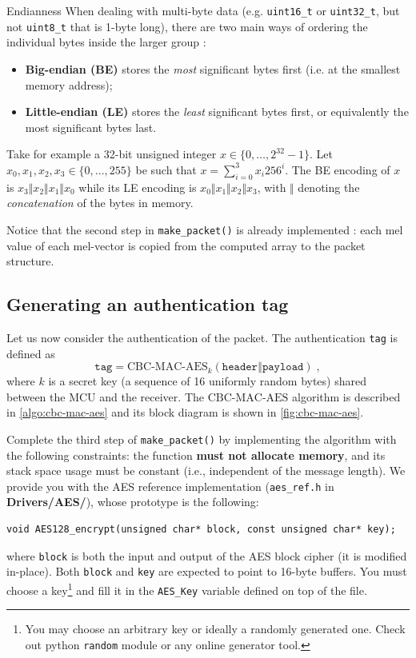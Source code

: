 \begin{bclogo}[couleur = gray!20, arrondi = 0.2, logo=\bcinfo]{Endianness}
	When dealing with multi-byte data (e.g. \texttt{uint16\_t} or \texttt{uint32\_t}, but not \texttt{uint8\_t} that is 1-byte long), there are two main ways of ordering the individual bytes inside the larger group :
	\begin{itemize}
		\item \textbf{Big-endian (BE)} stores the \textit{most} significant bytes first (i.e. at the smallest memory address);
		\item \textbf{Little-endian (LE)} stores the \textit{least} significant bytes first, or equivalently the most significant bytes last.
	\end{itemize}
    Take for example a 32-bit unsigned integer $x \in \{0,\dots, 2^{32}-1\}$.
    Let $x_0,x_1,x_2,x_3\in\{0,...,255\}$ be such that $x = \sum_{i=0}^3 x_i 256^i$.
    The BE encoding of $x$ is
    \texttt{$x_3$$\mathbin\Vert$$x_2$$\mathbin\Vert$$x_1$$\mathbin\Vert$$x_0$}
    while its LE encoding is
    \texttt{$x_0$$\mathbin\Vert$$x_1$$\mathbin\Vert$$x_2$$\mathbin\Vert$$x_3$},
    with $\mathbin\Vert$ denoting the \textit{concatenation} of the bytes in memory.
\end{bclogo}

Notice that the second step in \texttt{make\_packet()} is already implemented : each mel value of each mel-vector is copied from the computed array to the packet structure.

\subsection{Generating an authentication tag}

Let us now consider the authentication of the packet. The authentication \texttt{tag} is defined as
\[
    \texttt{tag} = \text{CBC-MAC-AES}_{k}\left(
        \texttt{header$\mathbin\Vert$payload}
    \right)\;,
\]
where $k$ is a secret key (a sequence of 16 uniformly random bytes) shared between the MCU and the receiver. The $\text{CBC-MAC-AES}$ algorithm is described in \autoref{algo:cbc-mac-aes} and its block diagram is shown in \autoref{fig:cbc-mac-aes}.

Complete the third step of \texttt{make\_packet()} by implementing the algorithm with the following constraints: the function \textbf{must not allocate memory}, and its stack space usage must be constant (i.e., independent of the message length).
We provide you with the AES reference implementation (\texttt{aes\_ref.h} in \textbf{Drivers/AES/}), whose
prototype is the following:
\begin{lstlisting}[style=customc]
void AES128_encrypt(unsigned char* block, const unsigned char* key);
\end{lstlisting}
where \texttt{block} is both the input and output of the AES block cipher (it
is modified in-place).
Both \texttt{block} and \texttt{key} are expected to point to 16-byte buffers. You must choose a key\footnote{You may choose an arbitrary key or ideally a randomly generated one. Check out python \texttt{random} module or any online generator tool.} and fill it in the \texttt{AES\_Key} variable defined on top of the file.

